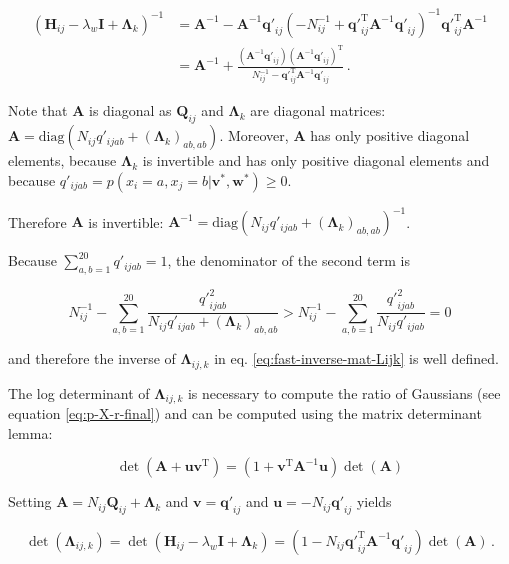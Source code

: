 \documentclass[12pt,a4paper,twoside]{book}
\newcommand{\eq}{\!=\!}
\renewcommand{\H}{\mathbf{H}}
\newcommand{\I}{\mathbf{I}}
\newcommand{\Lijk}{\mathbf{\Lambda}_{ij,k}}
\newcommand{\Lk}{\mathbf{\Lambda}_k}
\newcommand{\Qij}{\mathbf{Q}_{ij}}
\newcommand{\qij}{\mathbf{q\prime}_{ij}}
\renewcommand{\v}{\mathbf{v}}
\newcommand{\w}{\mathbf{w}}
\theoremstyle{definition}
\theoremstyle{definition}
\theoremstyle{remark}
\begin{document}
\begin{align}
      \left( \H_{ij} - \lambda_w \I + \Lk \right)^{-1} & = \mathbf{A}^{-1} - \mathbf{A}^{-1} \qij  \left( -N_{ij}^{-1}  + \qij^\mathrm{T} \mathbf{A}^{-1} \qij \right)^{-1}  \qij^\mathrm{T} \mathbf{A}^{-1} \\
     & = \mathbf{A}^{-1} + \frac{ (\mathbf{A}^{-1} \qij) (\mathbf{A}^{-1} \qij)^{\mathrm{T}} }{ N_{ij}^{-1} - \qij^\mathrm{T} \mathbf{A}^{-1} \qij} \,.
\label{eq:fast-inverse-mat-Lijk}
\end{align}

Note that \(\mathbf{A}\) is diagonal as \(\Qij\) and \(\Lk\) are
diagonal matrices:
\(\mathbf{A} = \text{diag}(N_{ij} q'_{ijab} + (\Lk)_{ab,ab})\).
Moreover, \(\mathbf{A}\) has only positive diagonal elements, because
\(\Lk\) is invertible and has only positive diagonal elements and
because \(q'_{ijab} = p(x_i \eq a, x_j \eq b | \v^*,\w^*) \ge 0\).

Therefore \(\mathbf{A}\) is invertible:
\(\mathbf{A}^{-1} = \text{diag}(N_{ij} q'_{ijab} + (\Lk)_{ab,ab} )^{-1}\).

Because \(\sum_{a,b=1}^{20} q'_{ijab} = 1\), the denominator of the
second term is

\begin{equation}
    N_{ij}^{-1} - \sum_{a,b=1}^{20}  \frac{{q'}_{ijab}^2}{N_{ij} q'_{ijab} + {(\Lk)}_{ab,ab} } > N_{ij}^{-1} - \sum_{a,b=1}^{20} \frac{{q'}^2_{ijab}}{N_{ij} q'_{ijab}} = 0
\end{equation}

and therefore the inverse of \(\Lijk\) in eq.
\eqref{eq:fast-inverse-mat-Lijk} is well defined.

The log determinant of \(\Lijk\) is necessary to compute the ratio of
Gaussians (see equation \eqref{eq:p-X-r-final}) and can be computed using
the matrix determinant lemma:

\begin{equation}
  \det(\mathbf{A} + \mathbf{uv}^\mathrm{T}) = (1+\mathbf{v}^\mathrm{T} \mathbf{A}^{-1} \mathbf{u}) \det(\mathbf{A})
\end{equation}

Setting \(\mathbf{A} = N_{ij} \Qij + \Lk\) and \(\v = \qij\) and
\(\mathbf{u} = - N_{ij} \qij\) yields

\begin{equation}
  \det(\Lijk ) = \det(\H_{ij} - \lambda_w \I + \Lk) = (1 - N_{ij}\qij^\mathrm{T} \mathbf{A}^{-1}\qij) \det(\mathbf{A}) \,.
\end{equation}
\end{document}
